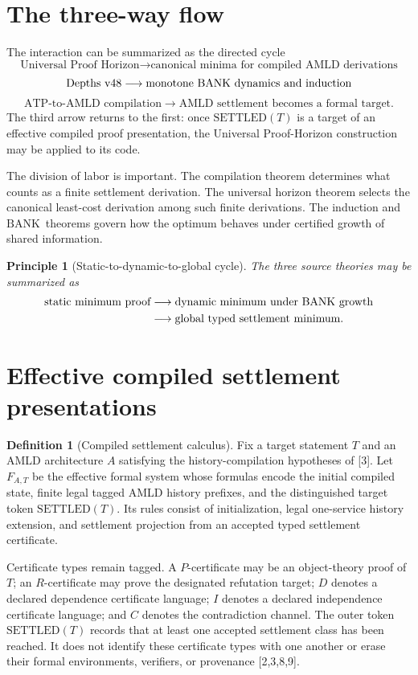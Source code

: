\documentclass[11pt]{article}
\newtheorem{principle}[theorem]{Principle}
\theoremstyle{definition}
\newtheorem{definition}[theorem]{Definition}
\newcommand{\BANK}{\ensuremath{\mathrm{BANK}}}
\newcommand{\SETTLED}{\ensuremath{\mathrm{SETTLED}}}
\begin{document}
\section{The three-way flow}
The interaction can be summarized as the directed cycle
\[
\text{Universal Proof Horizon}
\longrightarrow \text{canonical minima for compiled AMLD derivations}
\]
\[
\text{Depths v48}
\longrightarrow \text{monotone \BANK\ dynamics and induction}
\]
\[
\text{ATP-to-AMLD compilation}
\longrightarrow \text{AMLD settlement becomes a formal target}.
\]
The third arrow returns to the first: once $\SETTLED(T)$ is a target of an effective compiled proof presentation, the Universal Proof-Horizon construction may be applied to its code.

The division of labor is important. The compilation theorem determines what counts as a finite settlement derivation. The universal horizon theorem selects the canonical least-cost derivation among such finite derivations. The induction and \BANK\ theorems govern how the optimum behaves under certified growth of shared information.

\begin{principle}[Static-to-dynamic-to-global cycle]
The three source theories may be summarized as
\[
\begin{aligned}
\text{static minimum proof}
&\longrightarrow \text{dynamic minimum under \BANK\ growth}\\
&\longrightarrow \text{global typed settlement minimum}.
\end{aligned}
\]
\end{principle}

\section{Effective compiled settlement presentations}
\begin{definition}[Compiled settlement calculus]
Fix a target statement $T$ and an AMLD architecture $A$ satisfying the history-compilation hypotheses of [3]. Let $F_{A,T}$ be the effective formal system whose formulas encode the initial compiled state, finite legal tagged AMLD history prefixes, and the distinguished target token $\SETTLED(T)$. Its rules consist of initialization, legal one-service history extension, and settlement projection from an accepted typed settlement certificate.

Certificate types remain tagged. A $P$-certificate may be an object-theory proof of $T$; an $R$-certificate may prove the designated refutation target; $D$ denotes a declared dependence certificate language; $I$ denotes a declared independence certificate language; and $C$ denotes the contradiction channel. The outer token $\SETTLED(T)$ records that at least one accepted settlement class has been reached. It does not identify these certificate types with one another or erase their formal environments, verifiers, or provenance [2,3,8,9].
\end{definition}
\end{document}
